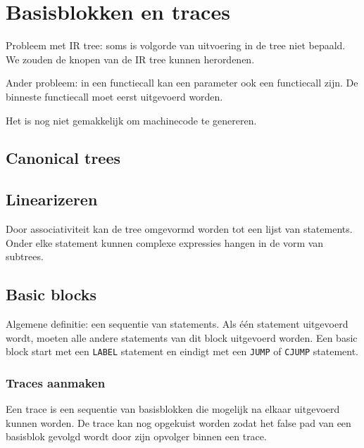 \chapter{Basisblokken en traces}

Probleem met IR tree: soms is volgorde van uitvoering in de tree niet bepaald. We zouden de knopen van de IR tree kunnen herordenen.

Ander probleem: in een functiecall kan een parameter ook een functiecall zijn. De binneste functiecall moet eerst uitgevoerd worden.

Het is nog niet gemakkelijk om machinecode te genereren.


\section{Canonical trees}


\section{Linearizeren}
Door associativiteit kan de tree omgevormd worden tot een lijst van statements. Onder elke statement kunnen complexe expressies hangen in de vorm van subtrees.



\section{Basic blocks}
Algemene definitie: een sequentie van statements. Als één statement uitgevoerd wordt, moeten alle andere statements van dit block uitgevoerd worden. Een basic block start met een \texttt{LABEL} statement en eindigt met een \texttt{JUMP} of \texttt{CJUMP} statement.

\subsection{Traces aanmaken}
Een trace is een sequentie van basisblokken die mogelijk na elkaar uitgevoerd kunnen worden. De trace kan nog opgekuist worden zodat het false pad van een basisblok gevolgd wordt door zijn opvolger binnen een trace.